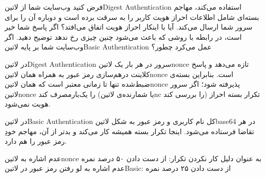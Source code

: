 
فرض کنید وب‌سایت شما از ‌لاتین{Digest Authentication} استفاده می‌کند، مهاجم بسته‌ای شامل اطلاعات احراز هویت کاربر را به سرقت برده است و دوباره آن را برای سرور شما ارسال می‌کند. آیا با اینکار احراز هویت اتفاق می‌افتد؟
اگر پاسخ شما خیر است، در رابطه با روشی که باعث می‌شود چنین چیزی رخ ندهد توضیح دهید.
اگر وب‌سایت شما بر پایه ‌لاتین{Basic Authentication} عمل می‌کرد چطور؟


\begin{پاسخ}

در ‌لاتین{Digest Authentication} سرور در هر بار یک ‌لاتین{nonce} تازه می‌دهد و پاسخ کلاینت درهم‌سازی رمز عبور به همراه همان ‌لاتین{nonce} است.
بنابراین بسته‌ی ضبط‌شده تنها تا زمانی معتبر است که همان ‌لاتین{nonce} پذیرفته شود؛ اگر سرور ‌لاتین{nonce} را یک‌بارمصرف کند (یا شمارنده‌ی ‌لاتین{nc} را بررسی کند) تکرار بسته احراز هویت نمی‌شود.

در ‌لاتین{Basic Authentication} کل نام کاربری و رمز عبور به شکل ‌لاتین{base64} در هر تقاضا فرستاده می‌شود.
اینجا تکرار بسته همیشه کار می‌کند و بدتر از آن، مهاجم خودِ رمز عبور را هم دارد.

 عدم اشاره به ‌لاتین{nonce} به عنوان دلیل کار نکردن تکرار: از دست دادن ۵۰ درصد نمره
 عدم اشاره به لو رفتن رمز عبور در ‌لاتین{Basic}: از دست دادن ۲۵ درصد نمره

\end{پاسخ}
